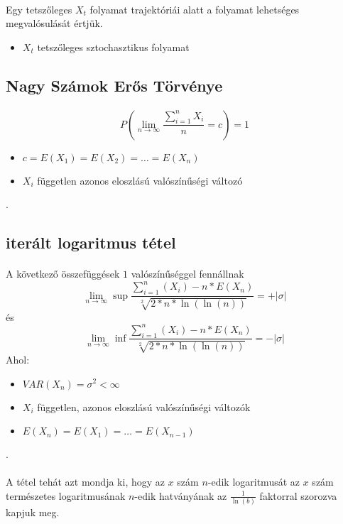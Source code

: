 \documentclass[11pt,a4paper]{article}
\begin{document}
				\paragraph{}
					Egy tetszőleges $X_t$ folyamat trajektóriái alatt a folyamat lehetséges megvalósulását értjük.
					\begin{itemize}
						\item $X_t$ tetszőleges sztochasztikus folyamat
					\end{itemize}
			\subsection{Nagy Számok Erős Törvénye}
				\paragraph{}
					$$P\left( \lim_{n \to \infty} \dfrac{\sum_{i=1}^n X_i}{n} = c\right) = 1$$
					\begin{itemize}
						\item $c = E(X_1)= E(X_2) = \dots = E(X_n)$
						\item $X_i$ független azonos eloszlású valószínűségi változó
					\end{itemize}.
			\subsection{iterált logaritmus tétel}
				\paragraph{}
					A következő összefüggések $1$ valószínűséggel fennállnak
					$$\lim_{n \to \infty} \sup \dfrac{\sum_{i=1}^n(X_i) - n* E(X_n)}{\sqrt[2]{2*n*\ln(\ln(n))}} = + | \sigma|$$
					és
					$$\lim_{n \to \infty} \inf \dfrac{\sum_{i=1}^n(X_i) - n* E(X_n)}{\sqrt[2]{2*n*\ln(\ln(n))}} = - | \sigma|$$
					Ahol:
					\begin{itemize}
						\item $VAR(X_n) = \sigma^2 < \infty$
						\item $X_i$ független, azonos eloszlású valószínűségi változók
						\item $E(X_n) = E(X_1) = \dots = E(X_{n-1})$
					\end{itemize}.
				\paragraph{}
					A tétel tehát azt mondja ki, hogy az $x$ szám $n$-edik logaritmusát az $x$ szám természetes logaritmusának $n$-edik hatványának az $\frac{1}{\ln(b)}$ faktorral szorozva kapjuk meg.
\end{document}
